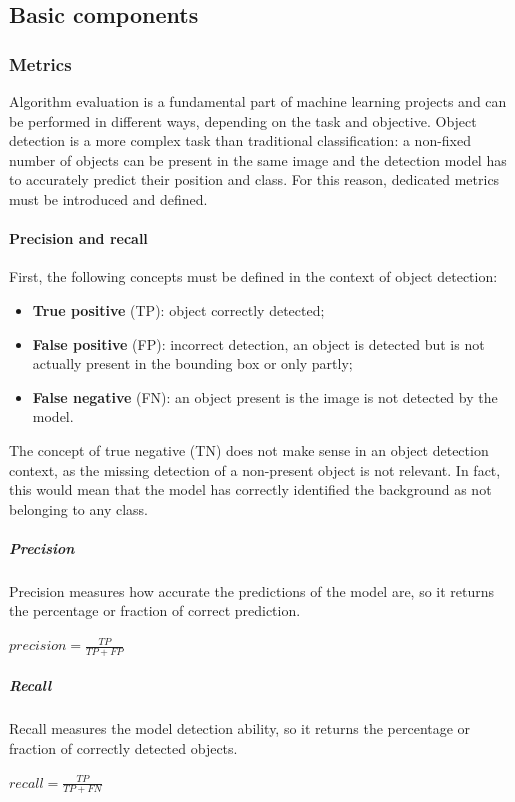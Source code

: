 \documentclass[%
    corpo=12pt,
    twoside,
    stile=classica,   
    tipotesi=magistrale,
    evenboxes,
    english,
	numerazioneromana,
]{toptesi}
\begin{document}
\subsection{Basic components}
\subsubsection{Metrics}
Algorithm evaluation is a fundamental part of machine learning projects and can be performed in different ways, depending on the task and objective. Object detection is a more complex task than traditional classification: a non-fixed number of objects can be present in the same image and the detection model has to accurately predict their position and class. For this reason, dedicated metrics must be introduced and defined.

\paragraph{Precision and recall}
First, the following concepts must be defined in the context of object detection:
\begin{itemize}
	\item \textbf{True positive} (TP): object correctly detected;
	\item \textbf{False positive} (FP): incorrect detection, an object is detected but is not actually present in the bounding box or only partly;
	\item \textbf{False negative} (FN): an object present is the image is not detected by the model.
\end{itemize}
The concept of true negative (TN) does not make sense in an object detection context, as the missing detection of a non-present object is not relevant. In fact, this would mean that the model has correctly identified the background as not belonging to any class.

\subparagraph{Precision}
Precision measures how accurate the predictions of the model are, so it returns the percentage or fraction of correct prediction.
\begin{center}
	$precision = \frac{TP}{TP+FP}$
\end{center}

\subparagraph{Recall}
Recall measures the model detection ability, so it returns the percentage or fraction of correctly detected objects.
\begin{center}
	$recall = \frac{TP}{TP+FN}$
\end{center}
\end{document}
